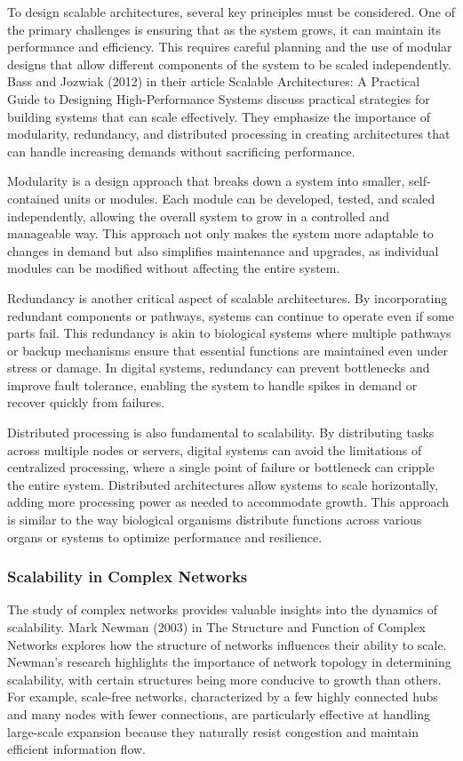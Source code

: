 \documentclass[12pt,twoside]{article}
\begin{document}
To design scalable architectures, several key principles must be considered. One of the primary challenges is ensuring that as the system grows, it can maintain its performance and efficiency. This requires careful planning and the use of modular designs that allow different components of the system to be scaled independently. Bass and Jozwiak (2012) in their article Scalable Architectures: A Practical Guide to Designing High-Performance Systems discuss practical strategies for building systems that can scale effectively. They emphasize the importance of modularity, redundancy, and distributed processing in creating architectures that can handle increasing demands without sacrificing performance.

Modularity is a design approach that breaks down a system into smaller, self-contained units or modules. Each module can be developed, tested, and scaled independently, allowing the overall system to grow in a controlled and manageable way. This approach not only makes the system more adaptable to changes in demand but also simplifies maintenance and upgrades, as individual modules can be modified without affecting the entire system.

Redundancy is another critical aspect of scalable architectures. By incorporating redundant components or pathways, systems can continue to operate even if some parts fail. This redundancy is akin to biological systems where multiple pathways or backup mechanisms ensure that essential functions are maintained even under stress or damage. In digital systems, redundancy can prevent bottlenecks and improve fault tolerance, enabling the system to handle spikes in demand or recover quickly from failures.

Distributed processing is also fundamental to scalability. By distributing tasks across multiple nodes or servers, digital systems can avoid the limitations of centralized processing, where a single point of failure or bottleneck can cripple the entire system. Distributed architectures allow systems to scale horizontally, adding more processing power as needed to accommodate growth. This approach is similar to the way biological organisms distribute functions across various organs or systems to optimize performance and resilience.

\subsubsection{Scalability in Complex Networks}

The study of complex networks provides valuable insights into the dynamics of scalability. Mark Newman (2003) in The Structure and Function of Complex Networks explores how the structure of networks influences their ability to scale. Newman’s research highlights the importance of network topology in determining scalability, with certain structures being more conducive to growth than others. For example, scale-free networks, characterized by a few highly connected hubs and many nodes with fewer connections, are particularly effective at handling large-scale expansion because they naturally resist congestion and maintain efficient information flow.
\end{document}
